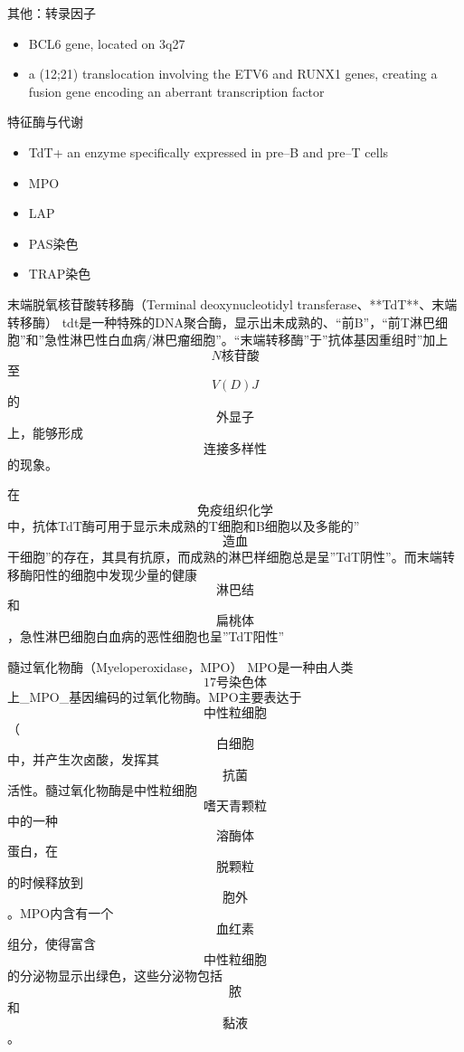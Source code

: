 \documentclass[
  ignorenonframetext,
]{beamer}
\begin{document}
\begin{frame}
\begin{block}{其他：转录因子}
\protect\hypertarget{ux5176ux4ed6ux8f6cux5f55ux56e0ux5b50}{}
\begin{itemize}
\item
  BCL6 gene, located on 3q27
\item
  a (12;21) translocation involving the ETV6 and RUNX1 genes, creating a
  fusion gene encoding an aberrant transcription factor
\end{itemize}
\end{block}
\end{frame}

\begin{frame}
\begin{block}{特征酶与代谢}
\protect\hypertarget{ux7279ux5f81ux9176ux4e0eux4ee3ux8c22}{}
\begin{itemize}
\item
  TdT+ an enzyme specifically expressed in pre--B and pre--T cells
\item
  MPO
\item
  LAP
\item
  PAS染色
\item
  TRAP染色
\end{itemize}
\end{block}
\end{frame}

\begin{frame}
\begin{block}{末端脱氧核苷酸转移酶（Terminal deoxynucleotidyl
transferase、**TdT**、末端转移酶）}
\protect\hypertarget{ux672bux7aefux8131ux6c27ux6838ux82f7ux9178ux8f6cux79fbux9176terminal-deoxynucleotidyl-transferasetdtux672bux7aefux8f6cux79fbux9176}{}
tdt是一种特殊的DNA聚合酶，显示出未成熟的、``前B''，``前T淋巴细胞''和''急性淋巴性白血病/淋巴瘤细胞''。``末端转移酶''于''抗体基因重组时''加上\[N核苷酸\]至\[V(D)J\]的\[外显子\]上，能够形成\[连接多样性\]的现象。

在\[免疫组织化学\]中，抗体TdT酶可用于显示未成熟的T细胞和B细胞以及多能的''\[造血\]干细胞''的存在，其具有抗原，而成熟的淋巴样细胞总是呈''TdT阴性''。而末端转移酶阳性的细胞中发现少量的健康\[淋巴结\]和\[扁桃体\]，急性淋巴细胞白血病的恶性细胞也呈''TdT阳性''
\end{block}
\end{frame}

\begin{frame}
\begin{block}{髓过氧化物酶（Myeloperoxidase，MPO）}
\protect\hypertarget{ux9ad3ux8fc7ux6c27ux5316ux7269ux9176myeloperoxidasempo}{}
MPO是一种由人类\[17号染色体\]上\_MPO\_基因编码的过氧化物酶。MPO主要表达于\[中性粒细胞\]（\[白细胞\]中，并产生次卤酸，发挥其\[抗菌\]活性。髓过氧化物酶是中性粒细胞\[嗜天青颗粒\]中的一种\[溶酶体\]蛋白，在\[脱颗粒\]的时候释放到\[胞外\]。MPO内含有一个\[血红素\]组分，使得富含\[中性粒细胞\]的分泌物显示出绿色，这些分泌物包括\[脓\]和\[黏液\]。
\end{block}
\end{frame}
\end{document}
